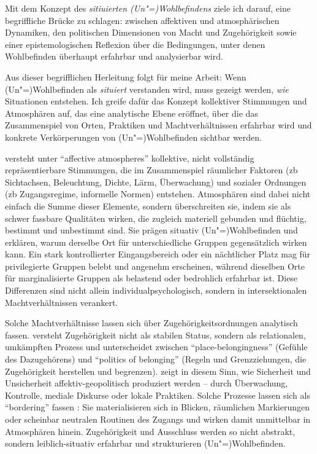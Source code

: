 Mit dem Konzept des \emph{sitiuierten (Un\nobreakdash"=)Wohlbefindens} ziele ich darauf, eine begriffliche Brücke zu schlagen: zwischen affektiven und atmosphärischen Dynamiken, den politischen Dimensionen von Macht und Zugehörigkeit sowie einer epistemologischen Reflexion über die Bedingungen, unter denen Wohlbefinden überhaupt erfahrbar und analysierbar wird.

\vspace{1em}

Aus dieser begrifflichen Herleitung folgt für meine Arbeit: Wenn (Un\nobreakdash"=)Wohlbefinden als \emph{situiert} verstanden wird, muss gezeigt werden, \emph{wie} Situationen entstehen. Ich greife dafür das Konzept kollektiver Stimmungen und Atmosphären auf, das eine analytische Ebene eröffnet, über die das Zusammenspiel von Orten, Praktiken und Machtverhältnissen erfahrbar wird und konkrete Verkörperungen von (Un\nobreakdash"=)Wohlbefinden sichtbar werden.

\textcite{andersonAffectiveAtmospheres2009} versteht unter \enquote{affective atmospheres} kollektive, nicht vollständig repräsentierbare Stimmungen, die im Zusammenspiel räumlicher Faktoren (\gls{zb} Sichtachsen, Beleuchtung, Dichte, Lärm, Überwachung) und sozialer Ordnungen (\gls{zb} Zugangsregime, informelle Normen) entstehen. Atmosphären sind dabei nicht einfach die Summe dieser Elemente, sondern überschreiten sie, indem sie als schwer fassbare Qualitäten wirken, die zugleich materiell gebunden und flüchtig, bestimmt und unbestimmt sind. Sie prägen situativ (Un\nobreakdash"=)Wohlbefinden und erklären, warum derselbe Ort für unterschiedliche Gruppen gegensätzlich wirken kann. Ein stark kontrollierter Eingangsbereich oder ein nächtlicher Platz mag für privilegierte Gruppen belebt und angenehm erscheinen, während dieselben Orte für marginalisierte Gruppen als belastend oder bedrohlich erfahrbar ist. Diese Differenzen sind nicht allein individualpsychologisch, sondern in intersektionalen Machtverhältnissen verankert.

Solche Machtverhältnisse lassen sich über Zugehörigkeitsordnungen analytisch fassen. \textcite{antonsichSearchingBelongingAnalytical2010} versteht Zugehörigkeit nicht als stabilen Status, sondern als relationalen, umkämpften Prozess und unterscheidet zwischen \enquote{place-belongingness} (Gefühle des Dazugehörens) und \enquote{politics of belonging} (Regeln und Grenzziehungen, die Zugehörigkeit herstellen und begrenzen). \textcite{painGlobalizedFearEmotional2009} zeigt in diesem Sinn, wie Sicherheit und Unsicherheit affektiv-geopolitisch produziert werden -- durch Überwachung, Kontrolle, mediale Diskurse oder lokale Praktiken. Solche Prozesse lassen sich als \enquote{bordering} fassen \parencite[\gls{vgl}][]{yuval-davisBelongingPoliticsBelonging2006}: Sie materialisieren sich in Blicken, räumlichen Markierungen oder scheinbar neutralen Routinen des Zugangs und wirken damit unmittelbar in Atmosphären hinein. Zugehörigkeit und Ausschluss werden so nicht abstrakt, sondern leiblich-situativ erfahrbar und strukturieren (Un\nobreakdash"=)Wohlbefinden.


